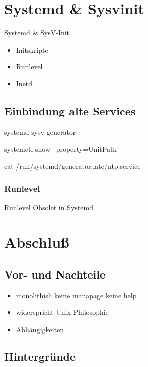 \section{Systemd \& Sysvinit}

\begin{frame}{Systemd \& SysV-Init}
  \begin{itemize}
  \item Initskripte
  \item Runlevel
  \item Inetd
  \end{itemize}
\end{frame}

\subsection{Einbindung alte Services}

\begin{frame}
systemd-sysv-generator

 systemctl show --property=UnitPath

 cat /run/systemd/generator.late/ntp.service
\end{frame}

 \subsubsection{Runlevel}

\begin{frame}{Runlevel}
 Obsolet in Systemd
\end{frame}

\section{Abschluß}
\subsection{Vor- und Nachteile}

\begin{frame}
\begin{itemize}
\item monolithish keine manapage keine help
\item widerspricht Unix-Philosophie
\item Abhängigkeiten
\end{itemize}
\end{frame}

\subsection{Hintergründe}

